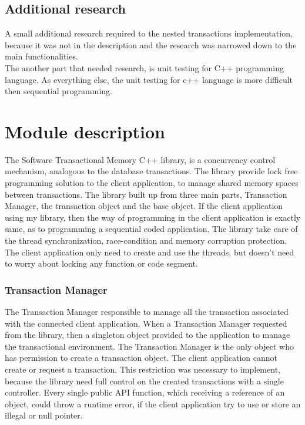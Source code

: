 \documentclass[12pt]{article}
\begin{document}
\subsection{Additional research}
A small additional research required to the nested transactions implementation, because it was not in the description and the research was narrowed down to the main functionalities.\\
The another part that needed research, is unit testing for C++ programming language.\cite{cookbook} As everything else, the unit testing for c++ language is more difficult then sequential programming.

\section{Module description}
The Software Transactional Memory C++ library, is a concurrency control mechanism, analogous to the database transactions. The library provide lock free programming solution to the client application, to manage shared memory spaces between transactions. The library built up from three main parts, Transaction Manager, the transaction object and the base object. If the client application using my library, then the way of programming in the client application is exactly same, as to programming a sequential coded application. The library take care of the thread synchronization, race-condition and memory corruption protection. The client application only need to create and use the threads, but doesn't need to worry about locking any function or code segment.   


\subsubsection{Transaction Manager}
The Transaction Manager responsible to manage all the transaction associated with the connected client application. When a Transaction Manager requested from the library, then a singleton object provided to the application to manage the transactional environment. The Transaction Manager is the only object who has permission to create a transaction object. The client application cannot create or request a transaction. This restriction was necessary to implement, because the library need full control on the created transactions with a single controller. Every single public API function, which receiving a reference of an object, could throw a runtime error, if the client application try to use or store an illegal or null pointer.\\
\end{document}
